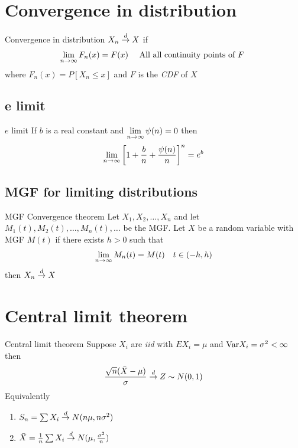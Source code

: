 \documentclass[16pt,a4paper]{article}
\begin{document}
\newpage
\section{Convergence in distribution}

\begin{defn}{Convergence in distribution}
    $X_n \overset{d}{\to} X$ if 
    \begin{align*}
        \lim\limits_{n \rightarrow \infty} F_n(x) = F(x) && \text{ All all continuity points of $F$ } 
    \end{align*}
    where $F_n(x) = P[X_n \leq x]$ and $F$ is the \textit{CDF} of $X$
\end{defn}

\subsection{e limit}
\begin{thm}{$e$ limit}
    If $b$ is a real constant and $\lim\limits_{n \rightarrow \infty}\psi(n) = 0$ then 
    \begin{align*}
        \lim\limits_{n \rightarrow \infty} \left[1+\frac{b}{n}+\frac{\psi(n)}{n}\right]^n = e^b
    \end{align*} 
\end{thm}

\subsection{MGF for limiting distributions}
\begin{thm}{MGF Convergence theorem}
    Let $X_1, X_2, \ldots, X_n$ and let $M_1(t), M_2(t), \ldots, M_n(t), \ldots$ be the MGF. Let $X$ be a random variable with MGF $M(t)$ if there exists $h> 0$ such that 
    \begin{align*}
        \lim\limits_{n \rightarrow \infty} M_n(t) = M(t) && t \in (-h,h)
    \end{align*}
    then $X_n \overset{d}{\to} X$
\end{thm}
\newpage
\section{Central limit theorem}
\begin{thm}{Central limit theorem}
    Suppose $X_i$ are \textit{iid} with $EX_i = \mu$ and $\mathrm{Var} X_i = \sigma^2 < \infty$ then 
    \begin{align*}
        \frac{\sqrt{n}(\bar{X}-\mu)}{\sigma} \overset{d}{\to} Z \sim N(0,1)
    \end{align*}
    Equivalently 
    \begin{enumerate}[(1)]
        \item $S_n = \sum X_i \overset{d}{\to} N(n\mu, n\sigma^2)$
        \item $\bar{X}= \frac{1}{n}\sum X_i \overset{d}{\to} N(\mu, \frac{\sigma^2}{n})$

    \end{enumerate} 
\end{thm}
\newpage
\end{document}
